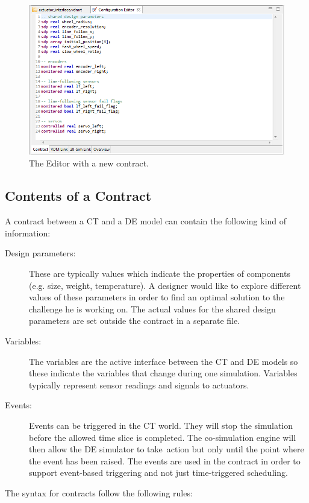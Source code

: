\documentclass{crescendorepchap}
\begin{document}
\begin{figure}[htbp]
\centering
\includegraphics[width=.6\textwidth]{images/DestecsEditorNewContract.png}
\caption{The Editor with a new contract.\label{fig:editorcontract2}}
\end{figure}

\subsection{Contents of a Contract}

A contract between a CT and a DE model can contain the following kind of
information:

\begin{description}
\item[Design parameters:] These are typically values which indicate
  the properties of components (e.g. size, weight, temperature). A
  designer would like to explore different values of these parameters in
  order to find an optimal solution to the challenge he is working on.
  The actual values for the shared design parameters are set outside the
  contract in a separate file.
\item[Variables:] The variables are the active interface between the
  CT and DE models so these indicate the variables that change during
  one simulation. Variables typically represent sensor readings and
  signals to actuators.
\item[Events:] Events can be triggered in the CT world. They
  will stop the simulation before the allowed time slice is completed.
  The co-simulation engine will then allow the DE simulator to
  take~action but only until the point where the event has been raised.
  The events are used in the contract in order to support event-based
  triggering and not just time-triggered scheduling.
\end{description}

The syntax for contracts follow the following rules:
\end{document}
